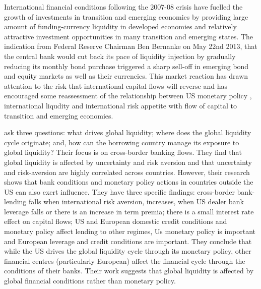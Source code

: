 \documentclass[12pt, a4paper, oneside]{article} %
\begin{document}

International financial conditions following the 2007-08 crisis have fuelled the growth of investments in transition and emerging economies by providing large amount of funding-currency liquidity in developed economies and relatively attractive investment opportunities in many transition and emerging states. The indication from Federal Reserve Chairman Ben Bernanke on May 22nd 2013, that the central bank would cut back its pace of liquidity injection by gradually reducing its monthly bond purchase triggered a sharp sell-off in emerging bond and equity markets as well as their currencies.  This market reaction has drawn attention to the risk that international capital flows will reverse and has encouraged some reassessment of the relationship between US monetary policy , international liqudity and international risk appetite with flow of capital to transition and emerging economies.   

\citet{Cerutti2014} ask three questions:  what drives global liquidity; where does the global liquidity cycle originate; and, how can the borrowing country manage its exposure to global liquidity? Their focus is on cross-border banking flows. They find that global liquidity is affected by uncertainty and risk aversion and that uncertainty and risk-aversion are highly correlated across countries. However, their research shows that bank conditions and monetary policy actions in countries outside the US can also exert influence. They have three specific findings:  cross-border bank-lending falls when international risk aversion, increases, when US dealer bank leverage falls or there is an increase in term premia; there is a small interest rate effect on capital flows; US and European domestic credit conditions and monetary policy affect lending to other regimes, Us monetary policy is important and European leverage and credit conditions are important.  They conclude that while the US drives the global liquidity cycle through its monetary policy, other financial centres (particularly European) affect the financial cycle through the conditions of their banks. Their work suggests that global liquidity is affected by global financial conditions rather than monetary policy.
\end{document}

